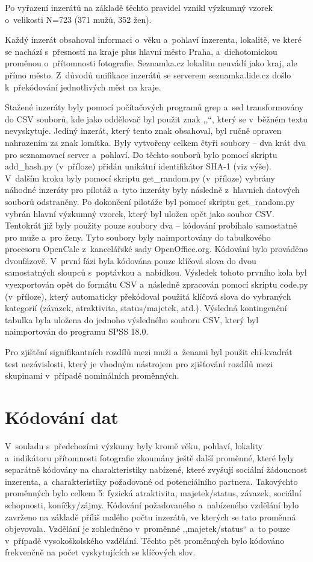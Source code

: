 \documentclass[a4paper, 12pt, notitlepage, oneside, numbers=noenddot]{report}
\begin{document}
Po vyřazení inzerátů na základě těchto pravidel vznikl výzkumný vzorek
o~velikosti N=723 (371 mužů, 352 žen).

Každý inzerát obsahoval informaci o~věku a~pohlaví inzerenta,
lokalitě, ve které se nachází s~přesností na kraje plus hlavní město
Praha, a~dichotomickou proměnou o~přítomnosti fotografie. Seznamka.cz
lokalitu neuvádí jako kraj, ale přímo město. Z~důvodů unifikace
inzerátů se serverem seznamka.lide.cz došlo k~překódování jednotlivých
měst na kraje.

Stažené inzeráty byly pomocí počítačových programů grep a~sed
transformovány do CSV souborů, kde jako oddělovač byl použit znak
,,{\textbar}``, který se v~běžném textu nevyskytuje. Jediný inzerát,
který tento znak obsahoval, byl ručně opraven nahrazením za znak
lomítka. Byly vytvořeny celkem čtyři soubory -- dva krát dva pro
seznamovací server a~pohlaví. Do těchto souborů bylo pomocí skriptu
add\_hash.py (v~příloze) přidán unikátní identifikátor SHA-1 (viz
výše). V~dalším kroku byly pomocí skriptu get\_random.py (v~pří\-loze)
vybrány náhodné inzeráty pro pilotáž a~tyto inzeráty byly následně
z~hlavních datových souborů odstraněny. Po dokončení pilotáže byl
pomocí skriptu get\_random.py vybrán hlavní výzkumný vzorek, který byl
uložen opět jako soubor CSV.  Tentokrát již byly použity pouze soubory
dva -- kódování probíhalo samostatně pro muže a~pro ženy.  Tyto
soubory byly naimportovány do tabulkového procesoru OpenCalc
z~kancelářské sady OpenOffice.org. Kódování bylo prováděno
dvoufázově. V~první fázi byla kódována pouze klíčová slova do dvou
samostatných sloupců s~poptávkou a~nabídkou. Výsledek tohoto prvního
kola byl vyexportován opět do formátu CSV a~následně zpracován pomocí
skriptu code.py (v~příloze), který automaticky překódoval použitá
klíčová slova do vybraných kategorií (závazek, atraktivita,
status/majetek, atd.).  Výsledná kontingenční tabulka byla uložena do
jednoho výsledného souboru CSV, který byl naimportován do programu
SPSS 18.0.

Pro zjištění signifikantních rozdílů mezi muži a~ženami byl použit
chí-kvadrát test nezávislosti, který je vhodným nástrojem pro
zjišťování rozdílů mezi skupinami v~případě nominálních proměnných.

\section{Kódování dat}
V~souladu s~předchozími výzkumy
\citep{HarrisonSaeed1977,GreenlessMcGrew1994,BarrettDunbarLycett2007}
byly kromě věku, pohlaví, lokality a~indikátoru přítomnosti fotografie
zkoumány ještě další proměnné, které byly separátně kódovány na
charakteristiky nabízené, které zvyšují sociální žádoucnost inzerenta,
a~charakteristiky požadované od potenciálního partnera. Takovýchto
proměnných bylo celkem 5: fyzická atraktivita, majetek/status,
závazek, sociální schopnosti, koníčky/zájmy.  Kódování požadovaného
a~nabízeného vzdělání bylo zavrženo na základě příliš malého počtu
inzerátů, ve kterých se tato proměnná objevovala. Vzdělání je
zohledněno v~proměnné ,,majetek/sta\-tus`` a~to pouze v~případě
vysokoškolského vzdělání. Těchto pět proměnných bylo kódováno
frekvenčně na počet vyskytujících se klíčových slov.
\end{document}
